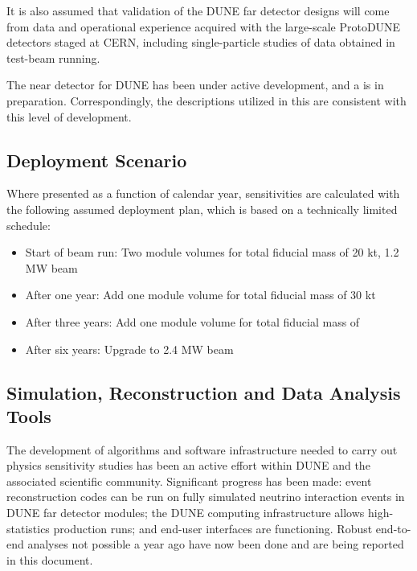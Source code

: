 It is also assumed that validation of the DUNE far detector 
designs will come from data and operational experience acquired 
with the large-scale ProtoDUNE detectors staged at CERN, 
including single-particle studies of data obtained 
in test-beam running.  

The near detector for DUNE has been under active development,
and a  is in preparation.
Correspondingly, the descriptions utilized in this 
are consistent with this level of development.  

\subsection{Deployment Scenario}
\label{sec:exec-phys-assm-meth-deployment}

Where presented as a function of calendar year,
sensitivities are calculated with the following
assumed deployment plan, which is based on a
technically limited schedule:
\begin{itemize}
    \item Start of beam run: Two  module %
    volumes for total fiducial mass of 20 kt, 1.2 MW beam
    \item After one year: Add one  module  volume for total fiducial mass of 30 kt
    \item After three years: Add one  module  volume for total fiducial mass of \fdfiducialmass
    \item After six years: Upgrade to 2.4 MW beam
\end{itemize}


\subsection{Simulation, Reconstruction and Data Analysis Tools}
\label{sec:exec-phys-assm-meth-simreco}

The development of algorithms and software infrastructure needed
to carry out physics sensitivity studies has been an active 
effort within DUNE and the associated scientific community.  
Significant progress has been made: event reconstruction 
codes can be run on fully simulated neutrino interaction events 
in DUNE far detector modules; the DUNE computing infrastructure 
allows high-statistics production runs; and end-user interfaces 
are functioning.  Robust end-to-end analyses not 
possible a year ago have now been done and are being 
reported in this document.


